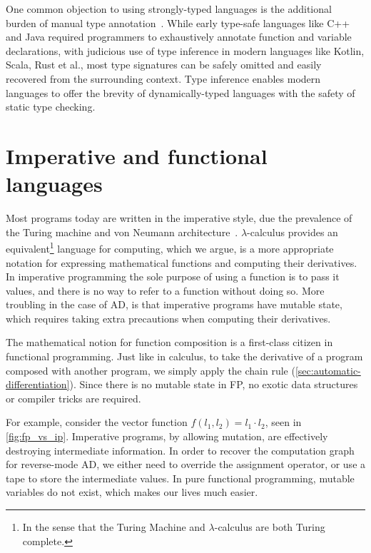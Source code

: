 One common objection to using strongly-typed languages is the additional burden of manual type annotation~\citep{ore2018assessing}. While early type-safe languages like C++ and Java required programmers to exhaustively annotate function and variable declarations, with judicious use of type inference in modern languages like Kotlin, Scala, Rust et al., most type signatures can be safely omitted and easily recovered from the surrounding context. Type inference enables modern languages to offer the brevity of dynamically-typed languages with the safety of static type checking.

\section{Imperative and functional languages}

Most programs today are written in the imperative style, due the prevalence of the Turing machine and von Neumann architecture~\citep{backus2007can}. $\lambda$-calculus provides an equivalent\footnote{In the sense that the Turing Machine and $\lambda$-calculus are both Turing complete.} language for computing, which we argue, is a more appropriate notation for expressing mathematical functions and computing their derivatives. In imperative programming the sole purpose of using a function is to pass it values, and there is no way to refer to a function without doing so. More troubling in the case of AD, is that imperative programs have mutable state, which requires taking extra precautions when computing their derivatives.

The mathematical notion for function composition is a first-class citizen in functional programming. Just like in calculus, to take the derivative of a program composed with another program, we simply apply the chain rule (\autoref{sec:automatic-differentiation}). Since there is no mutable state in FP, no exotic data structures or compiler tricks are required.

For example, consider the vector function $f(l_1, l_2) = l_1 \cdot l_2$, seen in \autoref{fig:fp_vs_ip}. Imperative programs, by allowing mutation, are effectively destroying intermediate information. In order to recover the computation graph for reverse-mode AD, we either need to override the assignment operator, or use a tape to store the intermediate values. In pure functional programming, mutable variables do not exist, which makes our lives much easier.

